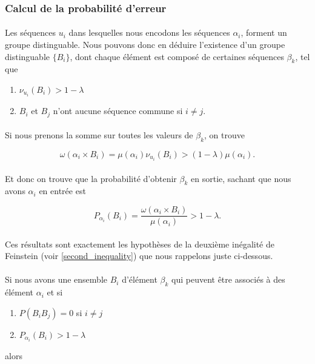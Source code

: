 \subsubsection*{Calcul de la probabilité d'erreur}
	
	\paragraph{}
	Les séquences $u_i$ dans lesquelles nous encodons les séquences $\alpha_i$, forment un groupe distinguable. Nous pouvons donc en déduire l'existence d'un groupe distinguable $\{B_i\}$, dont 
	chaque élément est composé de certaines séquences $\beta_k$, tel que 
	\begin{enumerate}
		\item $\nu_{u_i}(B_i) > 1-\lambda$
		\item $B_i$ et $B_j$ n'ont aucune séquence commune si $i\neq j$.
	\end{enumerate}
	
	\paragraph{}Si nous prenons la somme sur toutes les valeurs de $\beta_k$, on trouve
	
	\[\omega(\alpha_i \times B_i)=\mu(\alpha_i)\nu_{u_i}(B_i)>(1-\lambda)\mu(\alpha_i).\]
	
	\paragraph{}
	Et donc on trouve que la probabilité d'obtenir $\beta_k$ en sortie, sachant que nous avons $\alpha_i$ en entrée est
	
	\[P_{\alpha_i}(B_i)=\frac{\omega(\alpha_i \times B_i)}{\mu(\alpha_i)}>1-\lambda.\]
	
	\paragraph{}
	Ces résultats sont exactement les hypothèses de la deuxième inégalité de Feinstein (voir \ref{second_inequality}) 
	que nous rappelons juste ci-dessous.
	
	\paragraph{}
	Si nous avons une ensemble $B_i$ d'élément $\beta_k$ qui peuvent être associés à des élément $\alpha_i$ et si 
	\begin{enumerate}
		\item $P(B_iB_j)=0$ si $i\neq j$
		\item $P_{\alpha_i}(B_i)>1-\lambda$
	\end{enumerate}
	alors 
	
